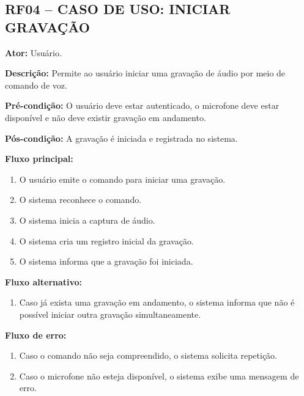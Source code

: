 \documentclass[12pt,oneside,a4paper,brazil,final]{abntex2}
\begin{document}
\clearpage
\subsection*{RF04 -- CASO DE USO: INICIAR GRAVAÇÃO}



\textbf{Ator:} Usuário.



\textbf{Descrição:} Permite ao usuário iniciar uma gravação de áudio por meio de comando de voz.



\textbf{Pré-condição:} O usuário deve estar autenticado, o microfone deve estar disponível e não deve existir gravação em andamento.



\textbf{Pós-condição:} A gravação é iniciada e registrada no sistema.



\textbf{Fluxo principal:}

\begin{enumerate}

    \item O usuário emite o comando para iniciar uma gravação.

    \item O sistema reconhece o comando.

    \item O sistema inicia a captura de áudio.

    \item O sistema cria um registro inicial da gravação.

    \item O sistema informa que a gravação foi iniciada.

\end{enumerate}



\textbf{Fluxo alternativo:}

\begin{enumerate}

    \item Caso já exista uma gravação em andamento, o sistema informa que não é possível iniciar outra gravação simultaneamente.

\end{enumerate}



\textbf{Fluxo de erro:}

\begin{enumerate}

    \item Caso o comando não seja compreendido, o sistema solicita repetição.

    \item Caso o microfone não esteja disponível, o sistema exibe uma mensagem de erro.

\end{enumerate}
\end{document}
